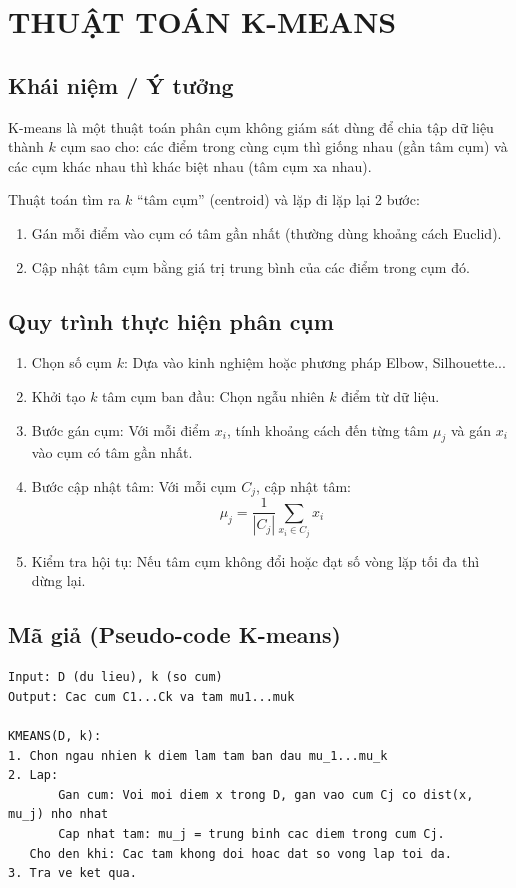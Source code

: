 \section{THUẬT TOÁN K-MEANS}

\subsection{Khái niệm / Ý tưởng}
K-means là một thuật toán phân cụm không giám sát dùng để chia tập dữ liệu thành $k$ cụm sao cho: các điểm trong cùng cụm thì giống nhau (gần tâm cụm) và các cụm khác nhau thì khác biệt nhau (tâm cụm xa nhau).

Thuật toán tìm ra $k$ ``tâm cụm'' (centroid) và lặp đi lặp lại 2 bước:
\begin{enumerate}
    \item Gán mỗi điểm vào cụm có tâm gần nhất (thường dùng khoảng cách Euclid).
    \item Cập nhật tâm cụm bằng giá trị trung bình của các điểm trong cụm đó.
\end{enumerate}

\subsection{Quy trình thực hiện phân cụm}
\begin{enumerate}
    \item Chọn số cụm $k$: Dựa vào kinh nghiệm hoặc phương pháp Elbow, Silhouette...
    \item Khởi tạo $k$ tâm cụm ban đầu: Chọn ngẫu nhiên $k$ điểm từ dữ liệu.
    \item Bước gán cụm: Với mỗi điểm $x_i$, tính khoảng cách đến từng tâm $\mu_j$ và gán $x_i$ vào cụm có tâm gần nhất.
    \item Bước cập nhật tâm: Với mỗi cụm $C_j$, cập nhật tâm:
    $$\mu_j = \frac{1}{|C_j|} \sum_{x_i \in C_j} x_i$$
    \item Kiểm tra hội tụ: Nếu tâm cụm không đổi hoặc đạt số vòng lặp tối đa thì dừng lại.
\end{enumerate}



\subsection{Mã giả (Pseudo-code K-means)}
\begin{lstlisting}[caption={Mã giả thuật toán K-means}]
Input: D (du lieu), k (so cum)
Output: Cac cum C1...Ck va tam mu1...muk

KMEANS(D, k):
1. Chon ngau nhien k diem lam tam ban dau mu_1...mu_k
2. Lap:
       Gan cum: Voi moi diem x trong D, gan vao cum Cj co dist(x, mu_j) nho nhat
       Cap nhat tam: mu_j = trung binh cac diem trong cum Cj.
   Cho den khi: Cac tam khong doi hoac dat so vong lap toi da.
3. Tra ve ket qua.
\end{lstlisting}

